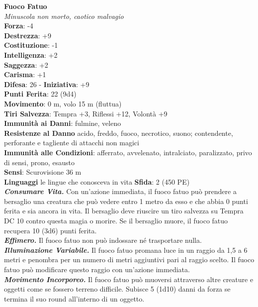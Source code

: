\begin{multicols}{2}
\medskip\textbf{Fuoco Fatuo}\\
\emph{Minuscola non morto, caotico malvagio}\\
\textbf{Forza}: -4\\
\textbf{Destrezza}: +9\\
\textbf{Costituzione}: -1\\
\textbf{Intelligenza}: +2\\
\textbf{Saggezza}: +2\\
\textbf{Carisma}: +1\\
\textbf{Difesa}: 26 - \textbf{Iniziativa}: +9\\
\textbf{Punti Ferita}: 22 (9d4)\\
\textbf{Movimento}: 0 m, volo 15 m (fluttua)\\
\textbf{Tiri Salvezza}: Tempra +3, Riflessi +12, Volontà +9\\
\textbf{Immunità ai Danni}: fulmine, veleno\\
\textbf{Resistenze al Danno} acido, freddo, fuoco, necrotico, suono; contendente, perforante e tagliente di attacchi non magici\\
\textbf{Immunità alle Condizioni}: afferrato, avvelenato, intralciato, paralizzato, privo di sensi, prono, esausto\\
\textbf{Sensi}: Scurovisione 36 m\\
\textbf{Linguaggi} le lingue che conosceva in vita
\textbf{Sfida}: 2 (450 PE)\smallskip\\
\emph{\textbf{Consumare Vita.}} Con un'azione immediata, il fuoco fatuo può prendere a bersaglio una creatura che può vedere entro 1 metro da esso e che abbia 0 punti ferita e sia ancora in vita. Il bersaglio deve riuscire un tiro salvezza su Tempra DC 10 contro questa magia o morire. Se il bersaglio muore, il fuoco fatuo recupera 10 (3d6) punti ferita.\\
\emph{\textbf{Effimero.}} Il fuoco fatuo non può indossare né trasportare nulla.\\
\emph{\textbf{Illuminazione Variabile.}} Il fuoco fatuo promana luce in un raggio da 1,5 a 6 metri e penombra per un numero di metri aggiuntivi pari al raggio scelto. Il fuoco fatuo può modificare questo raggio con un'azione immediata.\\
\emph{\textbf{Movimento Incorporeo.}} Il fuoco fatuo può muoversi attraverso altre creature e oggetti come se fossero terreno difficile. Subisce 5 (1d10) danni da forza se termina il suo round all'interno di un oggetto.\\

\end{multicols}
